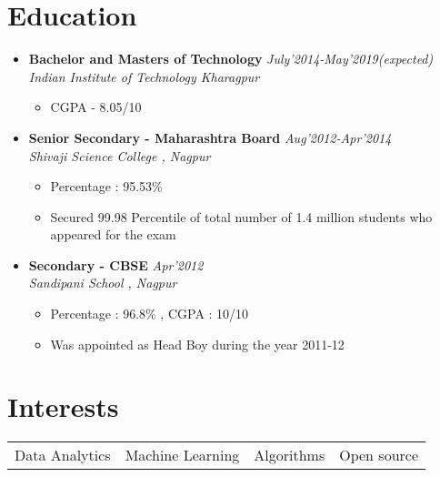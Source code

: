 \documentclass[11pt,a4paper]{moderncv}
\newcommand{\experiencetwo}[4]{
  \vspace{0.1cm}
\item \textbf{\large{#1}} \hfill\textit{#3}\\\textit{#2}
  \begin{itemize}[leftmargin=*]
    \setlength\itemsep{0em} #4
  \end{itemize}
}
\begin{document}
\maketitle
\vspace{-1cm}
\section*{Education}
\begin{itemize}
  \setlength\itemsep{0.5em}

  \experiencetwo{Bachelor and Masters of Technology}{Indian Institute of Technology Kharagpur}{July'2014-May'2019(expected)}{
   \item CGPA - 8.05/10
  }
  
  \experiencetwo{Senior Secondary - Maharashtra Board}{Shivaji Science College , Nagpur}{Aug'2012-Apr'2014}{
  \item Percentage : 95.53\%
  \item Secured 99.98 Percentile of total number of 1.4 million students who appeared for the exam 
  }

  \experiencetwo{Secondary - CBSE}{Sandipani School , Nagpur}{Apr'2012}{
  \item Percentage : 96.8\% , CGPA : 10/10
  \item Was appointed as Head Boy during the year 2011-12
  }
\end{itemize}

\section*{Interests}
\begin{tabular}{L{4cm} L{4cm} L{3.4cm} l}
 Data Analytics & Machine Learning & Algorithms & Open source \\
\end{tabular}

\vspace{-0.1cm}
\end{document}
